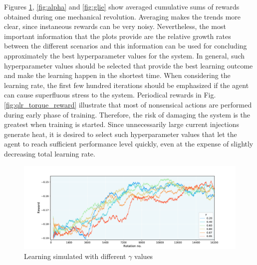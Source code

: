 Figures \ref{fig:gamma}, \ref{fig:alpha} and \ref{fig:glie} show averaged cumulative sums of rewards obtained during one mechanical revolution. Averaging makes the trends more clear, since instaneous rewards can be very noisy. Nevertheless, the most important information that the plots provide are the relative growth rates between the different scenarios and this information can be used for concluding approximately the best hyperparameter values for the system. In general, such hyperparameter values should be selected that provide the best learning outcome and make the learning happen in the shortest time. When considering the learning rate, the first few hundred iterations should be emphasized if the agent can cause superfluous stress to the system. Periodical rewards in Fig. \ref{fig:qlr_torque_reward} illustrate that most of nonsensical actions are performed during early phase of training. Therefore, the risk of damaging the system is the greatest when training is started. Since unnecessarily large current injections generate heat, it is desired to select such hyperparameter values that let the agent to reach sufficient performance level quickly, even at the expense of slightly decreasing total learning rate.
\begin{figure}[htb] 
    \centering
    \includegraphics[width=\textwidth]{images/Qgamma_wide.pdf}
    \caption{\small Learning simulated with different $\gamma$ values}
    \label{fig:gamma}
\end{figure}

